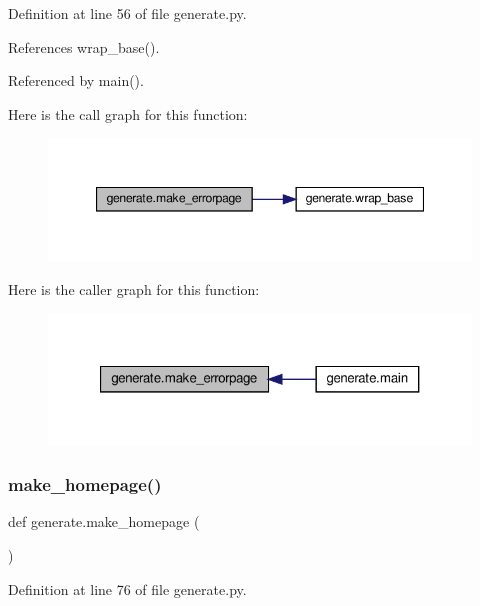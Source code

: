 Definition at line 56 of file generate.\+py.



References wrap\+\_\+base().



Referenced by main().

Here is the call graph for this function\+:
\nopagebreak
\begin{figure}[H]
\begin{center}
\leavevmode
\includegraphics[width=347pt]{namespacegenerate_a1c52bc54613c3a13c908bc65d7911b8e_cgraph}
\end{center}
\end{figure}
Here is the caller graph for this function\+:
\nopagebreak
\begin{figure}[H]
\begin{center}
\leavevmode
\includegraphics[width=321pt]{namespacegenerate_a1c52bc54613c3a13c908bc65d7911b8e_icgraph}
\end{center}
\end{figure}
\mbox{\label{namespacegenerate_acffbc7c203626a1f396da4a96a2d448d}} 
\subsubsection{\texorpdfstring{make\+\_\+homepage()}{make\_homepage()}}
{\footnotesize\ttfamily def generate.\+make\+\_\+homepage (\begin{DoxyParamCaption}{ }\end{DoxyParamCaption})}



Definition at line 76 of file generate.\+py.



